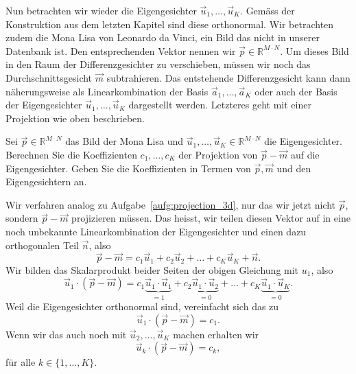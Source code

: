 Nun betrachten wir wieder die Eigengesichter $\vec u_1,\ldots,\vec u_K$.
Gemäss der Konstruktion aus dem letzten Kapitel sind diese orthonormal.
Wir betrachten zudem die Mona Lisa von Leonardo da Vinci, ein Bild das nicht in unserer Datenbank ist.
Den entsprechenden Vektor nennen wir $\vec p\in\mathbb R^{M\cdot N}$.
Um dieses Bild in den Raum der Differenzgesichter zu verschieben, müssen wir noch das Durchschnittsgesicht $\vec m$ subtrahieren.
Das entstehende Differenzgesicht kann dann näherungsweise als Linearkombination der Basis $\vec a_1,\ldots,\vec a_K$ oder auch der Basis der Eigengesichter $\vec u_1,\ldots,\vec u_K$ dargestellt werden.
Letzteres geht mit einer Projektion wie oben beschrieben.
\begin{aufgabe} \label{aufg:projection}
	Sei $\vec p\in\mathbb R^{M\cdot N}$ das Bild der Mona Lisa und $\vec u_1,\ldots,\vec u_K\in\mathbb R^{M\cdot N}$ die Eigengesichter.
	Berechnen Sie die Koeffizienten $c_1,\ldots,c_K$ der Projektion von $\vec p-\vec m$ auf die Eigengesichter.
	Geben Sie die Koeffizienten in Termen von $\vec p, \vec m$ und den Eigengesichtern an.
\end{aufgabe}
\begin{losung}
	Wir verfahren analog zu Aufgabe~\ref{aufg:projection_3d}, nur das wir jetzt nicht $\vec{p}$, sondern $\vec p-\vec m$ projizieren müssen.
	Das heisst, wir teilen diesen Vektor auf in eine noch unbekannte Linearkombination der Eigengesichter und einen dazu orthogonalen Teil $\vec{n}$, also
	\begin{equation*}
		\vec p-\vec m=c_1\vec u_1+c_2\vec u_2+\ldots+c_K\vec u_K+\vec{n}.
	\end{equation*}
	Wir bilden das Skalarprodukt beider Seiten der obigen Gleichung mit $u_1$, also
	\begin{equation*}
		\vec u_1\cdot\left(\vec p-\vec m\right)=c_1\underbrace{\vec u_1\cdot\vec u_1}_{=1}+c_2\underbrace{\vec u_1\cdot\vec u_2}_{=0}+\ldots+c_K\underbrace{\vec u_1\cdot\vec u_K}_{=0}.
	\end{equation*}
	Weil die Eigengesichter orthonormal sind, vereinfacht sich das zu
	\begin{equation*}
		\vec u_1\cdot\left(\vec p-\vec m\right)=c_1.
	\end{equation*}
	Wenn wir das auch noch mit $\vec u_2,\ldots,\vec u_K$ machen erhalten wir
	\begin{equation*}
		\vec u_k\cdot\left(\vec p-\vec m\right)=c_k,
	\end{equation*}
	für alle $k\in\{1,\ldots,K\}$.
\end{losung}

